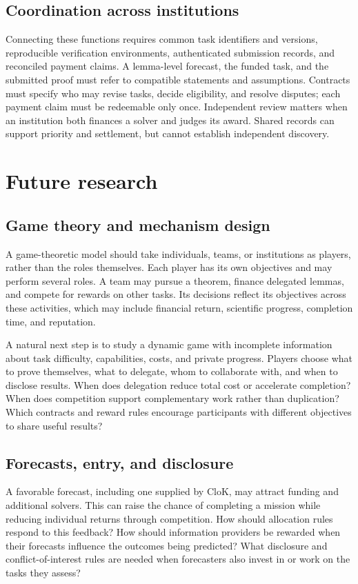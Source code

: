 \documentclass[11pt,a4paper,reqno]{amsart}
\numberwithin{equation}{section}
\begin{document}
\subsection{Coordination across institutions}
Connecting these functions requires common task identifiers and versions, reproducible verification environments, authenticated submission records, and reconciled payment claims. A lemma-level forecast, the funded task, and the submitted proof must refer to compatible statements and assumptions. Contracts must specify who may revise tasks, decide eligibility, and resolve disputes; each payment claim must be redeemable only once. Independent review matters when an institution both finances a solver and judges its award. Shared records can support priority and settlement, but cannot establish independent discovery.

\section{Future research}
\label{sec:research}

\subsection{Game theory and mechanism design}
A game-theoretic model should take individuals, teams, or institutions as players, rather than the roles themselves. Each player has its own objectives and may perform several roles. A team may pursue a theorem, finance delegated lemmas, and compete for rewards on other tasks. Its decisions reflect its objectives across these activities, which may include financial return, scientific progress, completion time, and reputation.

A natural next step is to study a dynamic game with incomplete information about task difficulty, capabilities, costs, and private progress. Players choose what to prove themselves, what to delegate, whom to collaborate with, and when to disclose results. When does delegation reduce total cost or accelerate completion? When does competition support complementary work rather than duplication? Which contracts and reward rules encourage participants with different objectives to share useful results?

\subsection{Forecasts, entry, and disclosure}
A favorable forecast, including one supplied by CloK, may attract funding and additional solvers. This can raise the chance of completing a mission while reducing individual returns through competition. How should allocation rules respond to this feedback? How should information providers be rewarded when their forecasts influence the outcomes being predicted? What disclosure and conflict-of-interest rules are needed when forecasters also invest in or work on the tasks they assess?
\end{document}
